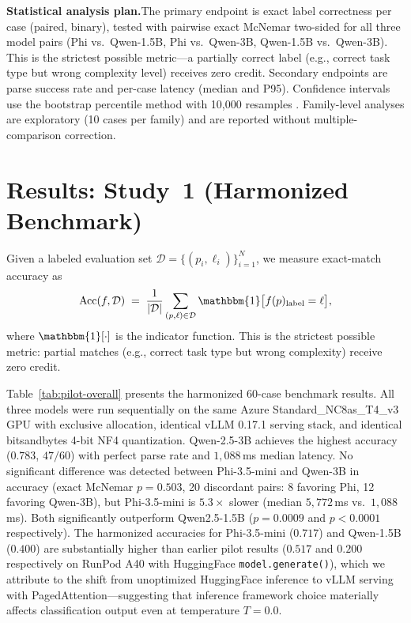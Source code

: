 \documentclass{article}
\newcommand{\ind}{\mathbbm{1}}
\begin{document}
\textbf{Statistical analysis plan.}\quad The primary endpoint is exact label correctness per case (paired, binary), tested with pairwise exact McNemar two-sided \citep{mcnemar1947} for all three model pairs (Phi vs.\ Qwen-1.5B, Phi vs.\ Qwen-3B, Qwen-1.5B vs.\ Qwen-3B). This is the strictest possible metric---a partially correct label (e.g., correct task type but wrong complexity level) receives zero credit. Secondary endpoints are parse success rate and per-case latency (median and P95). Confidence intervals use the bootstrap percentile method with 10,000 resamples \citep{efron1979bootstrap}. Family-level analyses are exploratory (10 cases per family) and are reported without multiple-comparison correction.

\section{Results: Study~1 (Harmonized Benchmark)}
\label{sec:results1}

Given a labeled evaluation set $\mathcal{D} = \{(p_i, \ell_i)\}_{i=1}^{N}$, we measure exact-match accuracy as
\begin{equation}
  \text{Acc}(f, \mathcal{D}) \;=\; \frac{1}{|\mathcal{D}|} \sum_{(p,\ell)\in\mathcal{D}} \ind\bigl[f(p)_{\text{label}} = \ell\bigr],
  \label{eq:accuracy}
\end{equation}
where $\ind[\cdot]$ is the indicator function. This is the strictest possible metric: partial matches (e.g., correct task type but wrong complexity) receive zero credit.

Table~\ref{tab:pilot-overall} presents the harmonized 60-case benchmark results. All three models were run sequentially on the same Azure Standard\_NC8as\_T4\_v3 GPU with exclusive allocation, identical vLLM 0.17.1 serving stack, and identical bitsandbytes 4-bit NF4 quantization. Qwen-2.5-3B achieves the highest accuracy ($0.783$, $47/60$) with perfect parse rate and $1{,}088$\,ms median latency. No significant difference was detected between Phi-3.5-mini and Qwen-3B in accuracy (exact McNemar $p = 0.503$, 20 discordant pairs: 8 favoring Phi, 12 favoring Qwen-3B), but Phi-3.5-mini is $5.3\times$ slower (median $5{,}772$\,ms vs.\ $1{,}088$\,ms). Both significantly outperform Qwen2.5-1.5B ($p = 0.0009$ and $p < 0.0001$ respectively). The harmonized accuracies for Phi-3.5-mini ($0.717$) and Qwen-1.5B ($0.400$) are substantially higher than earlier pilot results ($0.517$ and $0.200$ respectively on RunPod A40 with HuggingFace \texttt{model.generate()}), which we attribute to the shift from unoptimized HuggingFace inference to vLLM serving with PagedAttention---suggesting that inference framework choice materially affects classification output even at temperature $T = 0.0$.
\end{document}
